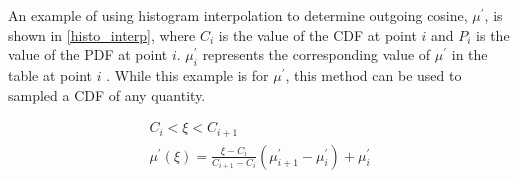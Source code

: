 An example of using histogram interpolation to determine outgoing cosine, $\mu^\prime$, is shown in \eqref{histo_interp}, where $C_{i}$ is the value of the CDF at point $i$ and $P_i$ is the value of the PDF at point $i$.  $\mu^\prime_i$ represents the corresponding value of $\mu^\prime$ in the table at point $i$ \cite{openmc}.
  While this example is for $\mu^\prime$, this method can be used to sampled a CDF of any quantity.

 \begin{equation}
\label{histo_interp}
\begin{gathered}
C_i < \xi < C_{i+1} \\
 \mu^\prime(\xi) = \frac{\xi-C_i}{C_{i+1}-C_i}(\mu^\prime_{i+1}-\mu^\prime_i) + \mu^\prime_i
\end{gathered}
\end{equation}


